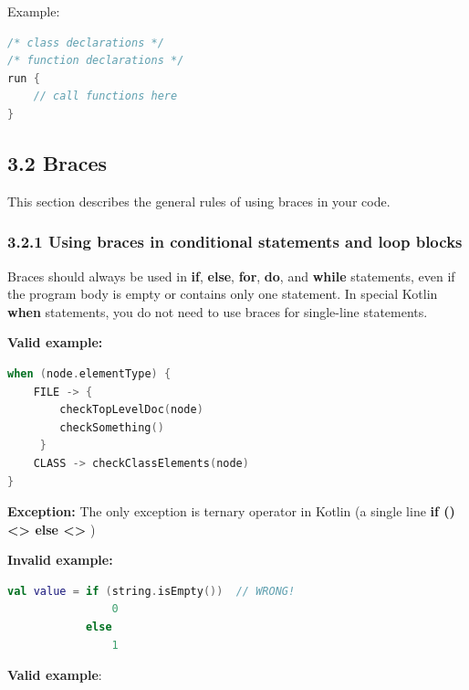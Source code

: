 Example:

\begin{lstlisting}[language=Kotlin]
/* class declarations */
/* function declarations */
run {
    // call functions here
}
\end{lstlisting}


\subsection*{\textbf{3.2 Braces}}

\label{sec:3.2}

This section describes the general rules of using braces in your code.

\subsubsection*{\textbf{3.2.1 Using braces in conditional statements and loop blocks}}
\leavevmode\newline

\label{sec:3.2.1}



Braces should always be used in \textbf{if}, \textbf{else}, \textbf{for}, \textbf{do}, and \textbf{while} statements, even if the program body is empty or contains only one statement. In special Kotlin \textbf{when} statements, you do not need to use braces for single-line statements. 



\textbf{Valid example:}



\begin{lstlisting}[language=Kotlin]
when (node.elementType) {
    FILE -> {
        checkTopLevelDoc(node)
        checkSomething()
     }
    CLASS -> checkClassElements(node)
}
\end{lstlisting}
\textbf{Exception:} The only exception is ternary operator in Kotlin (a single line \textbf{if () <> else <>} ) 



\textbf{Invalid example:}



\begin{lstlisting}[language=Kotlin]
val value = if (string.isEmpty())  // WRONG!
                0
            else
                1
\end{lstlisting}


\textbf{Valid example}: 



